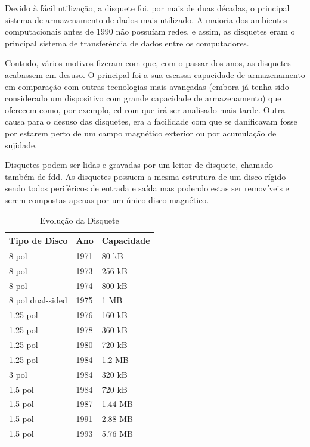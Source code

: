 \documentclass{report}
\begin{document}
		 Devido à fácil utilização, a disquete foi, por mais de duas décadas, o principal sistema de armazenamento de dados mais utilizado. A maioria dos ambientes computacionais antes de 1990 não possuíam redes, e assim, as disquetes eram o principal sistema de transferência de dados entre os computadores.
\vspace{1mm}
		
		Contudo, vários motivos fizeram com que, com o passar dos anos, as disquetes acabassem em desuso. O principal foi a sua escassa capacidade de armazenamento em comparação com outras tecnologias mais avançadas (embora já tenha sido considerado um dispositivo com grande capacidade de armazenamento) que oferecem como, por exemplo, \ac{cd-rom} que irá ser analisado mais tarde. Outra causa para o desuso das disquetes, era a facilidade com que se danificavam fosse por estarem perto de um campo magnético exterior ou por acumulação de sujidade.
\vspace{1mm}
	
		Disquetes podem ser lidas e gravadas por um leitor de disquete, chamado também de \ac{fdd}. As disquetes possuem a mesma estrutura de um disco rígido sendo todos periféricos de entrada e saída mas podendo estas ser removíveis e serem compostas apenas por um único disco magnético.
\vspace{1mm}
		
	\begin{table}[h]
		\centering
		\caption{Evolução da Disquete}
		\vspace{2mm}
		\label{Tabela de Disquete}
		\begin{tabular}{|l|l|l|}
		\hline
		\textbf{Tipo de Disco} & \textbf{Ano} & \textbf{Capacidade} \\ \hline
		8 pol            & 1971 & 80 kB   \\ \hline
		8 pol            & 1973 & 256 kB  \\ \hline
		8 pol            & 1974 & 800 kB  \\ \hline
		8 pol dual-sided & 1975 & 1 MB    \\ \hline
		1.25 pol         & 1976 & 160 kB  \\ \hline
		1.25 pol         & 1978 & 360 kB  \\ \hline
		1.25 pol         & 1980 & 720 kB  \\ \hline
		1.25 pol         & 1984 & 1.2 MB  \\ \hline
		3 pol            & 1984 & 320 kB  \\ \hline
		1.5 pol          & 1984 & 720 kB  \\ \hline
		1.5 pol          & 1987 & 1.44 MB \\ \hline
		1.5 pol          & 1991 & 2.88 MB \\ \hline
		1.5 pol          & 1993 & 5.76 MB \\ \hline
		
		\end{tabular}
		\end{table}		
 
\end{document}
